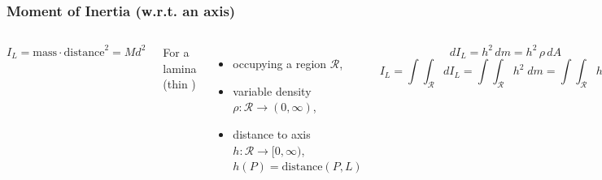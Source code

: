 \begin{frame}
  \frametitle{Moment of Inertia (w.r.t. an axis)}

\begin{columns}[t]
  \column{7cm}
  $$I_L = \text{mass} \cdot \text{distance}^2 = M d^2$$

  For a lamina (thin )
  \begin{itemize}
    \item occupying a region $\mathcal{R}$,
    \item variable density $\rho \colon \mathcal{R} \to (0,\infty)$,
    \item distance to axis $h \colon \mathcal{R} \to [0,\infty)$, $h(P) = \text{distance}(P,L)$
  \end{itemize}
%
$$dI_L = h^2 \, dm = h^2\, \rho \, dA$$
%
$$I_L = \int\!\!\!\int_{\mathcal{R}} dI_L = \int\!\!\!\int_{\mathcal{R}} h^2 \; dm =\int\!\!\!\int_{\mathcal{R}} h^2 \, \rho \, dA$$
  \column{5.5cm}
     \begin{figure}
        \includegraphics[width=2in]{../images/moment_inertia_lamina.eps}
    \end{figure}
\end{columns}
\end{frame}

